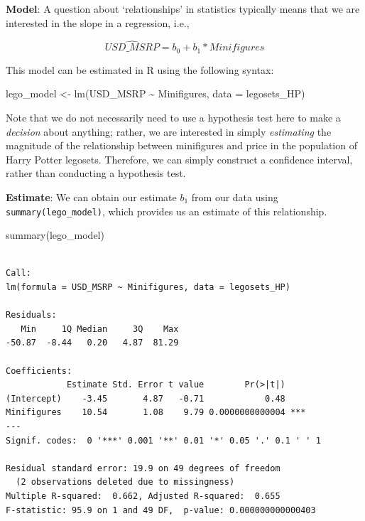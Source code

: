\documentclass[
  letterpaper,
  DIV=11,
  numbers=noendperiod]{scrreprt}
\newenvironment{Shaded}{\begin{snugshade}}{\end{snugshade}}
\newcommand{\AttributeTok}[1]{\textcolor[rgb]{0.40,0.45,0.13}{#1}}
\newcommand{\FunctionTok}[1]{\textcolor[rgb]{0.28,0.35,0.67}{#1}}
\newcommand{\NormalTok}[1]{\textcolor[rgb]{0.00,0.23,0.31}{#1}}
\newcommand{\OtherTok}[1]{\textcolor[rgb]{0.00,0.23,0.31}{#1}}
\newcommand{\SpecialCharTok}[1]{\textcolor[rgb]{0.37,0.37,0.37}{#1}}
\theoremstyle{definition}
\theoremstyle{remark}
\begin{document}
\textbf{Model}: A question about `relationships' in statistics typically
means that we are interested in the slope in a regression, i.e.,

\[\widehat{USD\_MSRP} = b_0 + b_1*Minifigures\]

This model can be estimated in R using the following syntax:

\begin{Shaded}
\begin{Highlighting}[]
\NormalTok{lego\_model }\OtherTok{\textless{}{-}} \FunctionTok{lm}\NormalTok{(USD\_MSRP }\SpecialCharTok{\textasciitilde{}}\NormalTok{ Minifigures, }\AttributeTok{data =}\NormalTok{ legosets\_HP)}
\end{Highlighting}
\end{Shaded}

Note that we do not necessarily need to use a hypothesis test here to
make a \emph{decision} about anything; rather, we are interested in
simply \emph{estimating} the magnitude of the relationship between
minifigures and price in the population of Harry Potter legosets.
Therefore, we can simply construct a confidence interval, rather than
conducting a hypothesis test.

\textbf{Estimate}: We can obtain our estimate \(b_1\) from our data
using \texttt{summary(lego\_model)}, which provides us an estimate of
this relationship.

\begin{Shaded}
\begin{Highlighting}[]
\FunctionTok{summary}\NormalTok{(lego\_model)}
\end{Highlighting}
\end{Shaded}

\begin{verbatim}

Call:
lm(formula = USD_MSRP ~ Minifigures, data = legosets_HP)

Residuals:
   Min     1Q Median     3Q    Max 
-50.87  -8.44   0.20   4.87  81.29 

Coefficients:
            Estimate Std. Error t value        Pr(>|t|)    
(Intercept)    -3.45       4.87   -0.71            0.48    
Minifigures    10.54       1.08    9.79 0.0000000000004 ***
---
Signif. codes:  0 '***' 0.001 '**' 0.01 '*' 0.05 '.' 0.1 ' ' 1

Residual standard error: 19.9 on 49 degrees of freedom
  (2 observations deleted due to missingness)
Multiple R-squared:  0.662, Adjusted R-squared:  0.655 
F-statistic: 95.9 on 1 and 49 DF,  p-value: 0.000000000000403
\end{verbatim}
\end{document}
